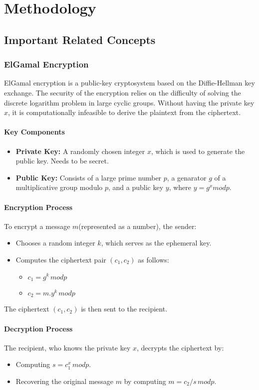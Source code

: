\documentclass[12pt,a4paper]{report}
\begin{document}
\chapter{Methodology}
\section{Important Related Concepts}

\subsection{ElGamal Encryption}
ElGamal encryption is a public-key cryptosystem based on the Diffie-Hellman key exchange\cite{elgamal}. The security of the encryption relies on the difficulty of solving the discrete logarithm problem in large cyclic groups. Without having the private key $x$, it is computationally infeasible to derive the plaintext from the ciphertext.
\subsubsection{Key Components}
\begin{itemize}
	\item \textbf{Private Key:} A randomly chosen integer $x$, which is used to generate the public key. Needs to be secret.
	\item \textbf{Public Key:} Consists of a large prime number $p$, a genarator $g$ of a multiplicative group modulo $p$, and a public key $y$, where $y = g^x mod p$.
\end{itemize}
\subsubsection{Encryption Process}
To encrypt a message $m$(represented as a number), the sender:
\begin{itemize}
	\item Chooses a random integer $k$, which serves as the ephemeral key.
	\item Computes the ciphertext pair $(c_1, c_2)$ as follows:
		\begin{itemize}
			\item $c_1 = g^k\, mod p$
			\item $c_2 = m . y^k\, mod p$
		\end{itemize}
\end{itemize}
The ciphertext $(c_1, c_2)$ is then sent to the recipient.
\subsubsection{Decryption Process}
The recipient, who knows the private key $x$, decrypts the ciphertext by:
\begin{itemize}
	\item Computing $s = c_{1}^{x}\, mod p$.
	\item Recovering the original message $m$ by computing $m = c_2 / s\, mod p$.
\end{itemize}
\end{document}
